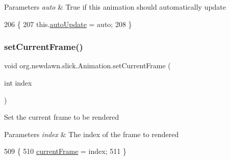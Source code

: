 \begin{DoxyParams}{Parameters}
{\em auto} & True if this animation should automatically update \\
\hline
\end{DoxyParams}

\begin{DoxyCode}
206                                             \{
207         this.\mbox{\hyperlink{classorg_1_1newdawn_1_1slick_1_1_animation_a343dbff14a050cf8753e9a67746deede}{autoUpdate}} = \textcolor{keyword}{auto};
208     \}
\end{DoxyCode}
\mbox{\label{classorg_1_1newdawn_1_1slick_1_1_animation_ae4fd05c73f24e269631b57bdffd93d45}} 
\subsubsection{\texorpdfstring{set\+Current\+Frame()}{setCurrentFrame()}}
{\footnotesize\ttfamily void org.\+newdawn.\+slick.\+Animation.\+set\+Current\+Frame (\begin{DoxyParamCaption}\item[{int}]{index }\end{DoxyParamCaption})\hspace{0.3cm}{\ttfamily [inline]}}

Set the current frame to be rendered


\begin{DoxyParams}{Parameters}
{\em index} & The index of the frame to rendered \\
\hline
\end{DoxyParams}

\begin{DoxyCode}
509                                            \{
510         \mbox{\hyperlink{classorg_1_1newdawn_1_1slick_1_1_animation_a358e1f2b9d9a05f83a416405e6bcd332}{currentFrame}} = index;
511     \}
\end{DoxyCode}
\mbox{\label{classorg_1_1newdawn_1_1slick_1_1_animation_a4874b5b993d67d24e7635b084cc9ccbc}} 
